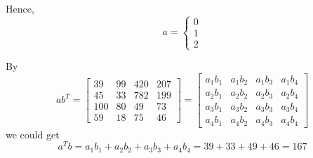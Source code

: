 \documentclass[11pt]{homework}
\begin{document}
    Hence,
    \begin{equation}
        a=\begin{cases}
            0\\
            1\\
            2
        \end{cases}
    \end{equation}

    \question
    By
    \begin{equation}
        ab^T=
        \left[\begin{array}{cccc}
        39 & 99 & 420 & 207 \\ 
        45 & 33 & 782 & 199 \\ 
        100 & 80 & 49 & 73 \\ 
        59 & 18 & 75 & 46
        \end{array}\right]
        =
        \left[\begin{array}{cccc}
        a_1 b_1 & a_1 b_2  & a_1 b_3  & a_1 b_4  \\ 
        a_2 b_1  & a_2 b_2  & a_2 b_3  & a_2 b_4  \\ 
        a_3 b_1  & a_3 b_2  & a_3 b_3  & a_3 b_4  \\ 
        a_4 b_1  & a_4 b_2  & a_4 b_3  & a_4 b_4 
        \end{array}\right]
    \end{equation}
    we could get
    \begin{equation}
        a^Tb=a_1 b_1 + a_2 b_2 + a_3 b_3 + a_4 b_4=39+33+49+46=167
    \end{equation}
\end{document}
